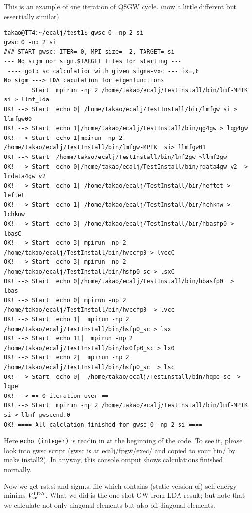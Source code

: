 This is an example of one iteration of QSGW cycle.
(now a little different but essentially similar)
\begin{verbatim}
takao@TT4:~/ecalj/test1$ gwsc 0 -np 2 si
gwsc 0 -np 2 si
### START gwsc: ITER= 0, MPI size=  2, TARGET= si
--- No sigm nor sigm.$TARGET files for starting ---
 ---- goto sc calculation with given sigma-vxc --- ix=,0
No sigm ---> LDA caculation for eigenfunctions 
        Start  mpirun -np 2 /home/takao/ecalj/TestInstall/bin/lmf-MPIK  si > llmf_lda 
OK! --> Start  echo 0| /home/takao/ecalj/TestInstall/bin/lmfgw si > llmfgw00 
OK! --> Start  echo 1|/home/takao/ecalj/TestInstall/bin/qg4gw > lqg4gw 
OK! --> Start  echo 1|mpirun -np 2 /home/takao/ecalj/TestInstall/bin/lmfgw-MPIK  si> llmfgw01 
OK! --> Start  /home/takao/ecalj/TestInstall/bin/lmf2gw >llmf2gw
OK! --> Start  echo 0|/home/takao/ecalj/TestInstall/bin/rdata4gw_v2  > lrdata4gw_v2 
OK! --> Start  echo 1| /home/takao/ecalj/TestInstall/bin/heftet > leftet 
OK! --> Start  echo 1| /home/takao/ecalj/TestInstall/bin/hchknw > lchknw 
OK! --> Start  echo 3| /home/takao/ecalj/TestInstall/bin/hbasfp0 > lbasC 
OK! --> Start  echo 3| mpirun -np 2 /home/takao/ecalj/TestInstall/bin/hvccfp0 > lvccC 
OK! --> Start  echo 3| mpirun -np 2 /home/takao/ecalj/TestInstall/bin/hsfp0_sc > lsxC 
OK! --> Start  echo 0|/home/takao/ecalj/TestInstall/bin/hbasfp0  > lbas 
OK! --> Start  echo 0| mpirun -np 2 /home/takao/ecalj/TestInstall/bin/hvccfp0  > lvcc 
OK! --> Start  echo 1|  mpirun -np 2 /home/takao/ecalj/TestInstall/bin/hsfp0_sc > lsx 
OK! --> Start  echo 11|  mpirun -np 2 /home/takao/ecalj/TestInstall/bin/hx0fp0_sc > lx0 
OK! --> Start  echo 2|  mpirun -np 2 /home/takao/ecalj/TestInstall/bin/hsfp0_sc  > lsc 
OK! --> Start  echo 0|  /home/takao/ecalj/TestInstall/bin/hqpe_sc  > lqpe 
OK! --> == 0 iteration over ==
OK! --> Start  mpirun -np 2 /home/takao/ecalj/TestInstall/bin/lmf-MPIK  si > llmf_gwscend.0 
OK! ==== All calclation finished for gwsc 0 -np 2 si ====
\end{verbatim}
Here \verb+echo (integer)+ is readin in at the beginning of the code.
To see it, please look into gwsc script (gwsc is at
ecalj/fpgw/exec/ and copied to your bin/ by make install2). 
In anyway, this console output shows calculations finished normally.

Now we get rst.si and sigm.si file which contains (static version of) self-energy
minims $V_{\rm xc}^{\rm LDA}$.
What we did is the one-shot GW from LDA result; but note that we
calculate not only diagonal elements but also off-diagonal elements. 

